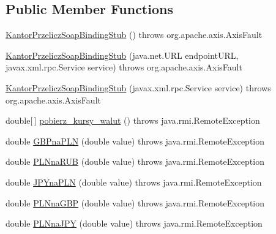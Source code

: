 \subsection*{Public Member Functions}
\begin{DoxyCompactItemize}
\item 
\hyperlink{classkantor_1_1com_1_1web_1_1service_1_1_kantor_przelicz_soap_binding_stub_a6c1f74a1f7117ce0ea705f95b1379c48}{Kantor\+Przelicz\+Soap\+Binding\+Stub} ()  throws org.\+apache.\+axis.\+Axis\+Fault 
\item 
\hyperlink{classkantor_1_1com_1_1web_1_1service_1_1_kantor_przelicz_soap_binding_stub_a184f971a2447a07891dc98a63c2e34f8}{Kantor\+Przelicz\+Soap\+Binding\+Stub} (java.\+net.\+U\+R\+L endpoint\+U\+R\+L, javax.\+xml.\+rpc.\+Service service)  throws org.\+apache.\+axis.\+Axis\+Fault 
\item 
\hyperlink{classkantor_1_1com_1_1web_1_1service_1_1_kantor_przelicz_soap_binding_stub_a7bc4e56824226c3446401756be37657b}{Kantor\+Przelicz\+Soap\+Binding\+Stub} (javax.\+xml.\+rpc.\+Service service)  throws org.\+apache.\+axis.\+Axis\+Fault 
\item 
double\mbox{[}$\,$\mbox{]} \hyperlink{classkantor_1_1com_1_1web_1_1service_1_1_kantor_przelicz_soap_binding_stub_a3ebaba4acb670e918a73250d4111afcf}{pobierz\+\_\+kursy\+\_\+walut} ()  throws java.\+rmi.\+Remote\+Exception 
\item 
double \hyperlink{classkantor_1_1com_1_1web_1_1service_1_1_kantor_przelicz_soap_binding_stub_a1189d528b2a2bc30b1d0dbd4cb3de879}{G\+B\+Pna\+P\+L\+N} (double value)  throws java.\+rmi.\+Remote\+Exception 
\item 
double \hyperlink{classkantor_1_1com_1_1web_1_1service_1_1_kantor_przelicz_soap_binding_stub_a9ee2c58b4dc1c11c5b434d4dcc391f9d}{P\+L\+Nna\+R\+U\+B} (double value)  throws java.\+rmi.\+Remote\+Exception 
\item 
double \hyperlink{classkantor_1_1com_1_1web_1_1service_1_1_kantor_przelicz_soap_binding_stub_a1640d46443427ccc4ac2e9fc78fbfdbc}{J\+P\+Yna\+P\+L\+N} (double value)  throws java.\+rmi.\+Remote\+Exception 
\item 
double \hyperlink{classkantor_1_1com_1_1web_1_1service_1_1_kantor_przelicz_soap_binding_stub_ac8cc82abe2de05d4ed53e0c44faf0669}{P\+L\+Nna\+G\+B\+P} (double value)  throws java.\+rmi.\+Remote\+Exception 
\item 
double \hyperlink{classkantor_1_1com_1_1web_1_1service_1_1_kantor_przelicz_soap_binding_stub_a642b141aac243d540b987f5269297354}{P\+L\+Nna\+J\+P\+Y} (double value)  throws java.\+rmi.\+Remote\+Exception 

\end{DoxyCompactItemize}
